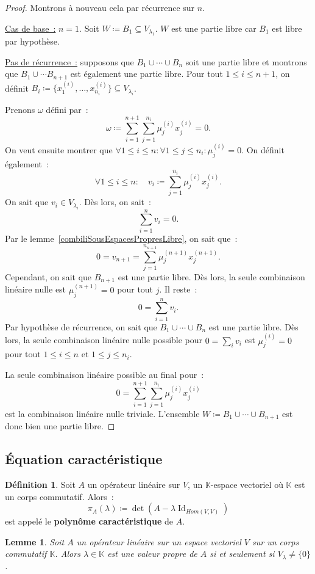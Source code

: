 \documentclass{article}
\DeclareMathOperator{\Id}{Id}
\newcommand{\K}{\mathbb K}
\newtheorem{lem}[thm]{Lemme}
\theoremstyle{definition}
\newtheorem{déf}[thm]{Définition}
\theoremstyle{remark}
\begin{document}
		\begin{proof} Montrons à nouveau cela par récurrence sur $n$.

		\underline{Cas de base~:} $n = 1$. Soit $W \coloneqq B_1 \subseteq V_{\lambda_1}$. $W$ est une partie libre car $B_1$ est libre par hypothèse.

		\underline{Pas de récurrence~:} supposons que $B_1 \cup \dotsb \cup B_n$ soit une partie libre et montrons que $B_1 \cup \dotsb B_{n+1}$ est également
		une partie libre. Pour tout $1 \leq i \leq n+1$, on définit $B_i \coloneqq \{x_1^{(i)}, \dotsc, x_{n_i}^{(i)}\} \subseteq V_{\lambda_i}$.

		Prenons $\omega$ défini par~: \[\omega \coloneqq \sum_{i=1}^{n+1}\sum_{j=1}^{n_i}\mu_j^{(i)}x_j^{(i)} = 0.\]
		On veut ensuite montrer que $\forall 1 \leq i \leq n : \forall 1 \leq j \leq n_i : \mu_j^{(i)} = 0$. On définit également~:
		\[\forall 1 \leq i \leq n : \quad v_i \coloneqq \sum_{j=1}^{n_i}\mu_j^{(i)}x_j^{(i)}.\]
		On sait que $v_i \in V_{\lambda_i}$. Dès lors, on sait~: \[\sum_{i=1}^nv_i = 0.\]
		Par le lemme~\ref{combiliSousEspacesPropresLibre}, on sait que~: \[0 = v_{n+1} = \sum_{j=1}^{n_{n+1}}\mu_j^{(n+1)}x_j^{(n+1)}.\]
		Cependant, on sait que $B_{n+1}$ est une partie libre. Dès lors, la seule combinaison linéaire nulle est $\mu_j^{(n+1)} = 0$ pour tout $j$.
		Il reste~: \[0 = \sum_{i=1}^nv_i.\] Par hypothèse de récurrence, on sait que $B_1 \cup \dotsb \cup B_n$ est une partie libre. Dès lors, la seule
		combinaison linéaire nulle possible pour $0 = \sum_iv_i$ est $\mu_j^{(i)} = 0$ pour tout $1 \leq i \leq n$ et $1 \leq j \leq n_i$.

		La seule combinaison linéaire possible au final pour~: \[0 = \sum_{i=1}^{n+1}\sum_{j=1}^{n_i}\mu_j^{(i)}x_j^{(i)}\] est la combinaison linéaire nulle
		triviale. L'ensemble $W \coloneqq B_1 \cup \dotsb \cup B_{n+1}$ est donc bien une partie libre. \end{proof}
	
	\subsection{Équation caractéristique}
		\begin{déf} Soit $A$ un opérateur linéaire sur $V$, un $\K$-espace vectoriel où $\K$ est un corps commutatif. Alors~:
		\[\pi_A(\lambda) \coloneqq \det(A - \lambda\Id_{Hom(V, V)})\] est appelé le \textbf{polynôme caractéristique} de $A$. \end{déf}

		\begin{lem}\label{valeurPropreiffVlambda} Soit $A$ un opérateur linéaire sur un espace vectoriel $V$ sur un corps commutatif $\K$. Alors $\lambda \in \K$
		est une valeur propre de $A$ si et seulement si $V_\lambda \neq \{0\}$. \end{lem}
\end{document}
